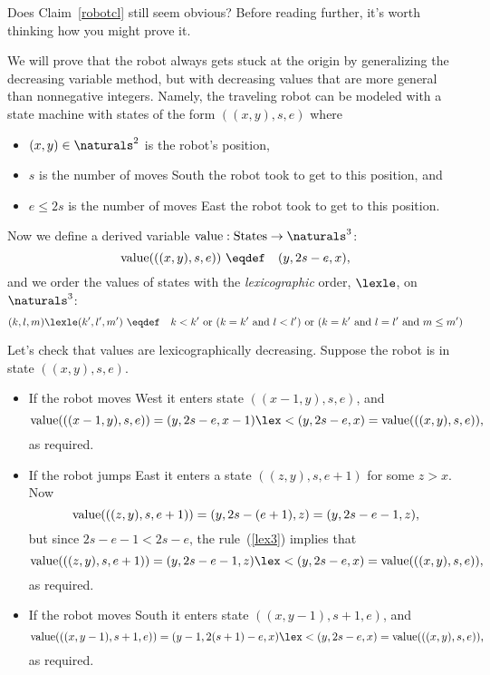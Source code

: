 Does Claim~\ref{robotcl} still seem obvious?  Before reading further, it's
worth thinking how you might prove it.

\iffalse
First give simple proof using Least Num Principle, first on number of
South moves to show robot reaches row 0, then number of East moves in row
0, then number of West moves in row 0.  Then segue into well-founded
decreasing variables.
\fi

We will prove that the robot always gets stuck at the origin by
generalizing the decreasing variable method, but with decreasing values
that are more general than nonnegative integers.  Namely, the traveling robot
can be modeled with a state machine with states of the form $((x,y),s,e)$
where
\begin{itemize}
\item $(x,y) \in \naturals^2$ is the robot's position,
\item $s$ is the number of moves South the robot took to get to this
position, and
\item $e \le 2s$ is the number of moves East the robot took to get to this
position. 
\end{itemize}

Now we define a derived variable $\vl:\text{States}\to \naturals^3$:
\[
\vl(((x,y),s,e)) \ \eqdef\quad (y,2s-e,x),
\]
and we order the values of states with the \emph{lexicographic} order,
$\lexle$, on $\naturals^3$:
\begin{equation}\label{lex3}
(k,l,m) \lexle (k',l',m') \ \eqdef\quad k < k' \text{ or } (k=k' \text{
and } l < l') \text{ or } (k=k' \text{ and } l = l' \text{ and } m \le m')
\end{equation}

Let's check that values are lexicographically decreasing.  Suppose the
robot is in state $((x,y),s,e)$.
\begin{itemize}
\item If the robot moves West it enters state $((x-1,y),s,e)$, and
\[
\vl(((x-1,y),s,e)) = (y,2s-e,x-1) \lex< (y,2s-e,x) = \vl(((x,y),s,e)),
\]
as required.


\item If the robot jumps East it enters a state $((z,y),s,e+1)$ for some
$z>x$.  Now
\[
\text{value}(((z,y),s,e+1)) = (y,2s-(e+1),z) = (y,2s-e-1,z),
\]
but since $2s-e-1 < 2s-e$, the rule~(\ref{lex3}) implies that
\[
\vl(((z,y),s,e+1)) = (y,2s-e-1,z)  \lex< (y,2s-e,x) = \vl(((x,y),s,e)),
\]
as required.

\item If the robot moves South it enters state $((x,y-1),s+1,e)$, and
\[
\vl(((x,y-1),s+1,e)) = (y-1,2(s+1)-e,x) \lex< (y,2s-e,x) = \vl(((x,y),s,e)),
\]
as required.

\end{itemize}

